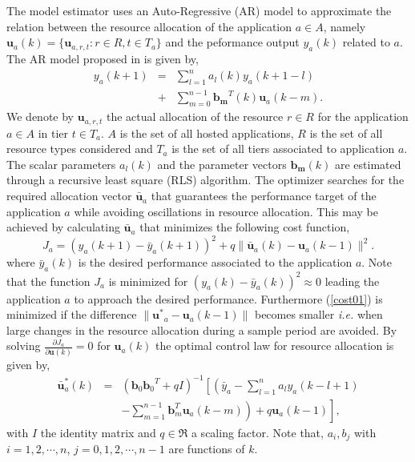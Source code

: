 The model estimator uses an Auto-Regressive (AR) model to approximate the relation between the resource allocation of the application
$a \in A$, namely $\mathbf{u}_{a}(k) = \{ \mathbf{u}_{a,r,t}:r \in R, t \in T_{a} \}$ and the peformance output $y_{a}(k)$ related to $a$. The AR model proposed in \cite{Abdelzaher-SIGMETRICS-2008} is given by,
\begin{eqnarray}
 y_{a}(k+1) &=& \sum_{l=1}^{n}a_{l}(k)y_{a}(k+1-l) \nonumber \\
& + & \sum_{m=0}^{n-1}\mathbf{b_{m}}^{T}(k)\mathbf{u}_{a}(k-m). \nonumber
\end{eqnarray}
We denote by $\mathbf{u}_{a,r,t}$ the actual allocation of the resource $r \in R$ for the application $a \in A$ in tier $t \in T_{a}$.
$A$ is the set of all hosted applications, $R$ is the set of all resource types considered and $T_{a}$ is the set of all tiers 
associated to application $a$. The scalar parameters $a_{l}(k)$ and the parameter vectors $\mathbf{b_{m}}(k)$ are estimated 
through a recursive least square (RLS) algorithm.
The optimizer searches for the required allocation vector ${\mathbf{\bar{u}}_{a}}$ that guarantees the performance target of the application $a$ while avoiding oscillations in 
resource allocation. This may be achieved by calculating $\mathbf{\bar{u}}_{a}$ that minimizes the following cost function,
\begin{equation}
 J_{a} = \left(y_{a}(k+1) - \bar{y}_{a}(k+1) \right)^{2} + q \| \mathbf{\bar{u}}_{a}(k) - {\mathbf{u}_{a}}(k-1) \|^{2}.
\label{cost01}
\end{equation}
where $\bar{y}_{a}(k)$ is the desired performance associated to the application $a$. Note that the function $J_a$ is minimized for $\left(y_{a}(k) - \bar{y}_{a}(k) \right)^{2} \approx 0$
 leading the application $a$ to approach the desired performance. Furthermore (\ref{cost01}) is minimized if the difference 
$\| {\mathbf{u^{*}}_{a}} - {\mathbf{u}_{a}}(k-1) \|$ becomes smaller \emph{i.e.} when large changes in the resource allocation  during a sample period are avoided.
By solving $\frac{\partial J_{a}}{\partial{\mathbf{u}(k)}} = 0$ for $\mathbf{u}_{a}(k)$ the optimal control law for resource allocation is given by,
\begin{eqnarray}
 {\mathbf{\bar{u}}_{a}^{*}}(k) & = & ({\mathbf{b}_{0}\mathbf{b}_{0}}^{T} + qI)^{-1}\left[ \left(\bar{y}_{a} - \sum_{l=1}^{n}a_{l}y_{a}(k-l+1)\right. \right. \nonumber \\
& & \left. \left.- \sum_{m=1}^{n-1}\mathbf{b}_{m}^{T}\mathbf{u}_{a}(k-m)\right) + q\mathbf{u}_{a}(k-1) \right], \nonumber
\end{eqnarray}
with $I$ the identity matrix and $q \in \Re$ a scaling factor. Note that, $a_i, b_j$ with $i=1,2,\cdots,n$, $j=0,1,2,\cdots,n-1$ are functions of $k$.


